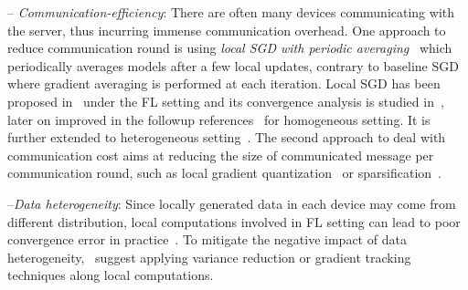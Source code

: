 \documentclass[11pt]{article}
\begin{document}
-- \emph{Communication-efficiency}: There are often many devices communicating with the server, thus incurring immense communication overhead. 
One approach to reduce communication round is using \emph{local SGD with periodic averaging}~\citep{zhou2018convergence,stich2019local,yu2019parallel,wang2018cooperative} which periodically averages models after a few local updates, contrary to baseline SGD~\citep{bottou-bousquet-2008} where gradient averaging is performed at each iteration.
Local SGD has been proposed in~\cite{mcmahan2016communication,konevcny2016federated} under the FL setting and its convergence analysis is studied in~\cite{stich2019local,wang2018cooperative,zhou2018convergence,yu2019parallel}, later on improved in the followup references~\citep{basu2019qsparse,haddadpour2019convergence,bayoumi2020tighter,stich2019error} for homogeneous setting. 
It is further extended to heterogeneous setting~\citep{haddadpour2019convergence,karimireddy2019scaffold,yu2019linear,li2019convergence,sahu2018convergence,liang2019variance}. The second approach to deal with communication cost aims at reducing the size of communicated message per communication round, such as local gradient quantization~\citep{alistarh2017qsgd,bernstein2018signsgd,tang2018communication,wen2017terngrad,wu2018error} or sparsification~\citep{alistarh2018convergence,lin2017deep,stich2018sparsified,stich2019error}. 


--\emph{Data heterogeneity}: 
Since locally generated data in each device may come from different distribution, local computations involved in FL setting can lead to poor convergence error in practice~\citep{li2019federated,liang2019variance}. 
To mitigate the negative impact of data heterogeneity,~\citep{haddadpour2020federated,horvath2019stochastic,liang2019variance,karimireddy2019scaffold} suggest applying variance reduction or gradient tracking techniques along local computations.
\end{document}
